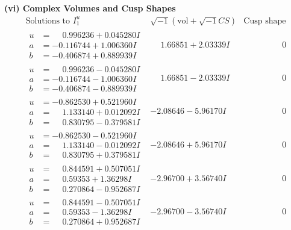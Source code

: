 \documentclass[1p]{elsarticle_modified}
\theoremstyle{definition}
\newcommand{\I}{\sqrt{-1}}
\begin{document}
\newpage\flushleft \textbf{(vi) Complex Volumes and Cusp Shapes}
$$\begin{array}{c|c|c}  
\text{Solutions to }I^u_{1}& \I (\text{vol} + \sqrt{-1}CS) & \text{Cusp shape}\\
 \hline 
\begin{aligned}
u &= \phantom{-}0.996236 + 0.045280 I \\
a &= -0.116744 + 1.006360 I \\
b &= -0.406874 + 0.889939 I\end{aligned}
 & \phantom{-}1.66851 + 2.03339 I & \phantom{-0.000000 } 0 \\ \hline\begin{aligned}
u &= \phantom{-}0.996236 - 0.045280 I \\
a &= -0.116744 - 1.006360 I \\
b &= -0.406874 - 0.889939 I\end{aligned}
 & \phantom{-}1.66851 - 2.03339 I & \phantom{-0.000000 } 0 \\ \hline\begin{aligned}
u &= -0.862530 + 0.521960 I \\
a &= \phantom{-}1.133140 + 0.012092 I \\
b &= \phantom{-}0.830795 - 0.379581 I\end{aligned}
 & -2.08646 - 5.96170 I & \phantom{-0.000000 } 0 \\ \hline\begin{aligned}
u &= -0.862530 - 0.521960 I \\
a &= \phantom{-}1.133140 - 0.012092 I \\
b &= \phantom{-}0.830795 + 0.379581 I\end{aligned}
 & -2.08646 + 5.96170 I & \phantom{-0.000000 } 0 \\ \hline\begin{aligned}
u &= \phantom{-}0.844591 + 0.507051 I \\
a &= \phantom{-}0.59353 + 1.36298 I \\
b &= \phantom{-}0.270864 - 0.952687 I\end{aligned}
 & -2.96700 + 3.56740 I & \phantom{-0.000000 } 0 \\ \hline\begin{aligned}
u &= \phantom{-}0.844591 - 0.507051 I \\
a &= \phantom{-}0.59353 - 1.36298 I \\
b &= \phantom{-}0.270864 + 0.952687 I\end{aligned}
 & -2.96700 - 3.56740 I & \phantom{-0.000000 } 0 \\ \hline\begin{aligned}

\end{aligned}
\end{array}$$
\end{document}
